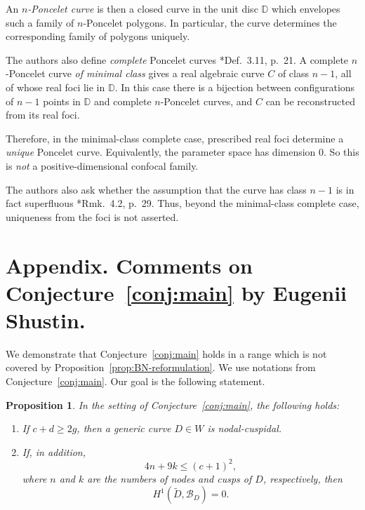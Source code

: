 \documentclass[11pt]{amsart}
\newtheorem{lemma}{Lemma}[section]
\newtheorem{prop}[lemma]{Proposition}
\theoremstyle{definition}
\theoremstyle{remark}
\begin{document}
An \emph{$n$-Poncelet curve} is then a closed curve in the unit disc $\mathbb D$ which
envelopes such a family of $n$-Poncelet polygons. In particular, the curve determines the
corresponding family of polygons uniquely.

The authors also define \emph{complete} Poncelet curves \cite{Hunziker}*{Def.~3.11,
p.~21}. A complete $n$-Poncelet curve \emph{of minimal class} gives a real algebraic curve
$C$ of class $n-1$, all of whose real foci lie in $\mathbb D$. In this case there is
a bijection between configurations of $n-1$ points in $\mathbb D$ and complete
$n$-Poncelet curves, and $C$ can be reconstructed from its real foci.

Therefore, in the minimal-class complete case, prescribed real foci determine a
\emph{unique} Poncelet curve. Equivalently, the parameter space has dimension
$0.$ 
So this is \emph{not} a positive-dimensional confocal family.

The authors also ask whether the assumption that the curve has class $n-1$ is in fact
superfluous \cite{Hunziker}*{Rmk.~4.2, p.~29}. Thus, beyond the minimal-class complete
case, uniqueness from the foci is not asserted. 

\section*{Appendix. Comments on Conjecture~\ref{conj:main} by Eugenii Shustin.}






We demonstrate that Conjecture~\ref{conj:main} holds in a range which is not covered by Proposition~\ref{prop:BN-reformulation}.
 We use notations from Conjecture~\ref{conj:main}. Our goal is the following statement.


\begin{prop}\label{p1}
In the setting of Conjecture~\ref{conj:main}, the following holds:
\begin{enumerate}\item[(1)] If $c+d\ge2g$, then
a generic curve $D\in W$ is nodal-cuspidal.
\item[(2)] If, in addition,
\begin{equation}4n+9k\le(c+1)^2,\label{e4}\end{equation}
where $n$ and $k$ are the numbers of nodes and cusps of $D$, respectively, then
\begin{equation}H^1(\widetilde D,{\mathcal B}_D)=0.\label{e3}\end{equation}
\end{enumerate}
\end{prop}
\end{document}
